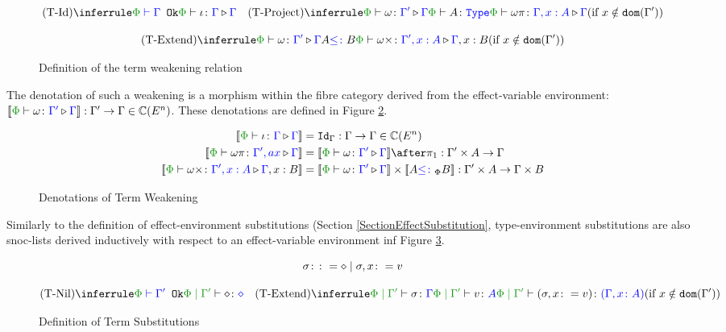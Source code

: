 \documentclass{Report}
\begin{document}
\begin{figure}[H]
    \centering
    \begin{framed}
        \[
            \ntreeruleI{\tid}{\wellformedok{\P}{\G}}{\pewrel{\i}{\G}{\G}}
            \quad  
            \condtreeruleII{\tproject}{\pewrel{\w}{\G'}{\G}}{\typerelation{\P}{A}{\type}}{\pewrel{\w \pi}{\G, x: A}{\G}}{x \notin \dom{\G'}}
        \]
        
        \[
            \condtreeruleII{\textend}{\pewrel{\w}{\G'}{\G}}{ A \subtype B}{\pewrel{\w \x}{\G', x: A}{\G, x: B}}{x \notin \dom{\G'}}
        \] 
    \end{framed}
    \caption{Definition of the term weakening relation}
    \label{TermWeakeningRelation}
\end{figure}


The denotation of such a weakening is a morphism within the fibre category derived from the effect-variable environment: $\deno{\pewrel{\w}{\G'}{\G}}: \G' \rightarrow \G \in \C(E^n)$. These denotations are defined in Figure \ref{TermWeakeningDenotations}.

\begin{figure}[H]
    \centering
    \begin{framed}
        \begin{align}
            \deno{\pewrel{\i}{\G}{\G}} &= \idg: \G \rightarrow \G \in \C(E^n)
            \\
            \deno{\pewrel{\w\pi}{\G', ax}{\G}} &= \deno{\pewrel{\w}{\G'}{\G}}\after\p: \G'\times A \rightarrow \G
            \\
            \deno{\pewrel{\w\x}{\G', x: A}{\G, x: B}} &= \deno{\pewrel{\w}{\G'}{\G}}\times \deno{A\subtypep B}: \G'\times A \rightarrow \G\times B
        \end{align}
        
    \end{framed}\caption{Denotations of Term Weakening}
    \label{TermWeakeningDenotations}
\end{figure}


Similarly to the definition of effect-environment substitutions (Section \ref{SectionEffectSubstitution}, type-environment substitutions are also snoc-lists derived inductively with respect to an effect-variable environment inf Figure \ref{TermSubstitutionDefinition}.

\begin{figure}[H]
    \centering
\begin{framed}
    
    \[
        \sigma\colon\colon=\diamond\mid\sigma,x\colon= v    
    \]

    \[
    \ntreeruleI{\tsubnil}{\wellformedok{\P}{\G'}}{\etyperelation{\P}{\G'}{\nil}{\nil}}
    \quad
    \condtreeruleII{\tsubextend}{
        \etyperelation{\P}{\G'}{\si}{\G}
    }{
        \etyperelation{\P}{\G'}{v}{A}
    }{
        \etyperelation{\P}{\G'}{(\si, x \setto v)}{(\gax)}
    }{x \notin \dom{\G'}}
\]
\end{framed}
    \caption{Definition of Term Substitutions}
    \label{TermSubstitutionDefinition}
\end{figure}
\end{document}
